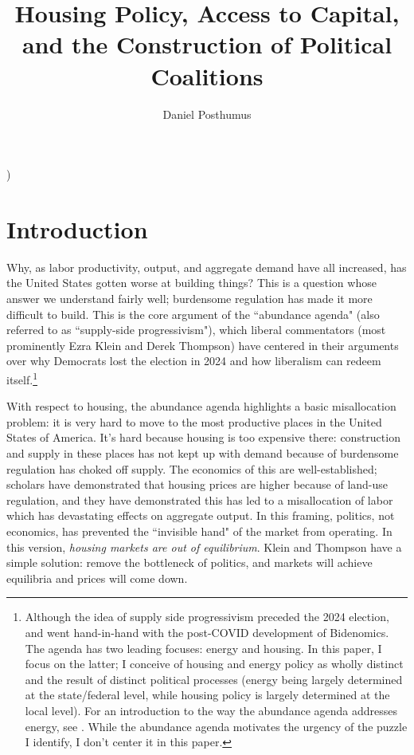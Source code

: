 )\documentclass{article}[11pt]
\begin{document}
\title{Housing Policy, Access to Capital, and the Construction of Political Coalitions} 
\author{Daniel Posthumus}

\maketitle

\section{Introduction}
Why, as labor productivity, output, and aggregate demand have all increased, has the United States gotten worse at building things? This is a question whose answer we understand fairly well; burdensome regulation has made it more difficult to build. This is the core argument of the ``abundance agenda" (also referred to as ``supply-side progressivism"), which liberal commentators (most prominently Ezra Klein and Derek Thompson) have centered in their arguments over why Democrats lost the election in 2024 and how liberalism can redeem itself.\footnote{Although the idea of supply side progressivism preceded the 2024 election, and went hand-in-hand with the post-COVID development of Bidenomics. The agenda has two leading focuses: energy and housing. In this paper, I focus on the latter; I conceive of housing and energy policy as wholly distinct and the result of distinct political processes (energy being largely determined at the state/federal level, while housing policy is largely determined at the local level). For an introduction to the way the abundance agenda addresses energy, see \citep{cheap2022energy}. While the abundance agenda motivates the urgency of the puzzle I identify, I don't center it in this paper.} \citep{klein2021economic} \citep{kleinthompson}

With respect to housing, the abundance agenda highlights a basic misallocation problem: it is very hard to move to the most productive places in the United States of America. It's hard because housing is too expensive there: construction and supply in these places has not kept up with demand because of burdensome regulation has choked off supply. \citep{glaeser2005} \citep{glaeser2005empirical} The economics of this are well-established; scholars have demonstrated that housing prices are higher because of land-use regulation, and they have demonstrated this has led to a misallocation of labor which has devastating effects on aggregate output. \citep{hsieh2019housing} In this framing, politics, not economics, has prevented the ``invisible hand" of the market from operating. In this version, \textit{housing markets are out of equilibrium}. Klein and Thompson have a simple solution: remove the bottleneck of politics, and markets will achieve equilibria and prices will come down.
\end{document}
